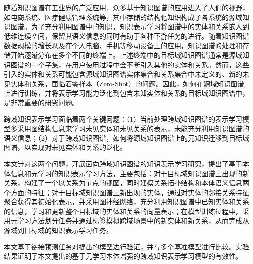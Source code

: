 随着知识图谱在工业界的广泛应用，众多基于知识图谱的应用进入了人们的视野，如电商系统、医疗健康管理系统等，其中存储的结构化知识构成了各系统的源域知识图谱。为了充分利用图谱中的知识，知识表示学习将图谱中的实体和关系嵌入到低维连续空间，保留其语义信息的同时有助于各种下游任务的进行。随着知识图谱数据规模的增长以及在个人电脑、手机等移动设备上的应用，知识图谱的处理和存储开始逐渐分布在多个不同的终端上。上述终端中的目标域知识图谱通常是源域知识图谱的一个子集，在用户使用过程中会不断引入其他的实体和关系。然而，这些引入的实体和关系可能包含源域知识图谱实体集合和关系集合中未定义的、新的未见实体和关系，面临着零样本（Zero-Shot）的问题。因此，如何在源域知识图谱上进行训练，并将表示学习能力泛化到包含未知实体和关系的目标域知识图谱中，是非常重要的研究问题。

跨域知识表示学习面临着两个关键问题：（1）当前处理跨域知识图谱的表示学习模型多采用图结构信息来学习未见实体和未见关系的表示，未能充分利用知识图谱的语义信息；（2）对于跨域知识图谱，如何将源域知识图谱上的元知识迁移到目标域图谱，以实现对未见实体和关系的泛化。

本文针对这两个问题，开展面向跨域知识图谱的知识表示学习研究，提出了基于本体信息和元学习的知识表示学习方法，主要包括：对于目标域知识图谱上出现的新关系，构建了一个以关系为节点的视图，同时建模关系拓扑结构和本体语义信息两个方面的特征；对于目标域知识图谱上新出现的实体，通过对实体的邻接关系特征聚合获得其初始化表示，并采用图神经网络，充分利用知识图谱中已知实体和关系的信息，学习和更新整个目标域的实体和关系的向量表示；在模型训练过程中，采用元学习方法划分任务并通过标签模拟跨域场景中的新实体和新关系，从而完成从源域到目标域的知识表示学习任务。

本文基于链接预测任务对提出的模型进行验证，并与多个基准模型进行比较。实验结果证明了本文提出的基于元学习本体增强的跨域知识表示学习模型的有效性。